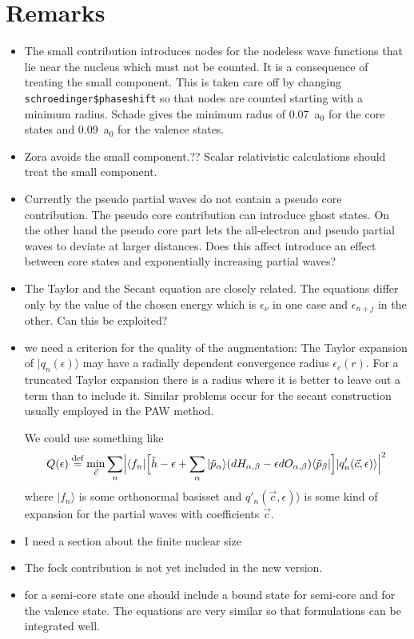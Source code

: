 \documentclass[11pt,a4paper]{report}
\begin{document}
\appendix
\chapter{Remarks}
\begin{itemize}
\item The small contribution introduces nodes for the nodeless wave
  functions that lie near the nucleus which must not be counted. It is
  a consequence of treating the small component. This is taken care
  off by changing \verb|schroedinger$phaseshift| so that nodes are
  counted starting with a minimum radius. Schade\cite{schade12_thesis}
  gives the minimum radus of 0.07~a$_0$ for the core states and
  0.09~a$_0$ for the valence states.
%
\item Zora avoids the small component.?? Scalar relativistic
  calculations should treat the small component.
%
\item Currently the pseudo partial waves do not contain a pseudo core
  contribution. The pseudo core contribution can introduce ghost
  states.  On the other hand the pseudo core part lets the
  all-electron and pseudo partial waves to deviate at larger
  distances. Does this affect introduce an effect between core states
  and exponentially increasing partial waves?
%
\item The Taylor and the Secant equation are closely related. The
  equations differ only by the value of the chosen energy which is
  $\epsilon_\nu$ in one case and $\epsilon_{n+j}$ in the other. Can
  this be exploited?
%
\item we need a criterion for the quality of the augmentation: The
  Taylor expansion of $|q_n(\epsilon)\rangle$ may have a radially
  dependent convergence radius $\epsilon_c(r)$. For a truncated Taylor
  expansion there is a radius where it is better to leave out a term
  than to include it. Similar problems occur for the secant
  construction usually employed in the PAW method.

  We could use something like
  \begin{eqnarray}
  Q(\epsilon)\stackrel{\text{def}}{=}\min_{\vec{c}}
\sum_n\Bigl|\langle f_n|\Bigl[\tilde{h}-\epsilon+
\sum_\alpha|\tilde{p}_\alpha\rangle(dH_{\alpha,\beta}-\epsilon dO_{\alpha,\beta})
\langle\tilde{p}_\beta|\Bigr]|q'_n(\vec{c},\epsilon)\rangle\Bigr|^2
  \end{eqnarray}
  where $|f_n\rangle$ is some orthonormal basisset and
  $q'_n(\vec{c},\epsilon)\rangle$ is some kind of expansion for the
  partial waves with coefficients $\vec{c}$.
%
\item I need a section about the finite nuclear size
%
\item The fock contribution is not yet included in the new version.
%
\item for a semi-core state one should include a bound state for
  semi-core and for the valence state. The equations are very similar
  so that formulations can be integrated well. 
%
\end{itemize}
\end{document}
